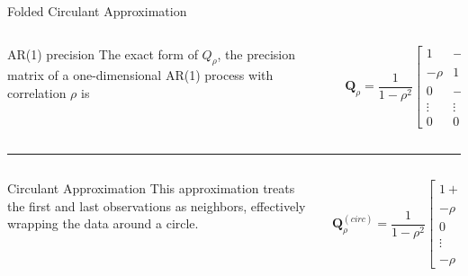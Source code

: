 \documentclass[
  ignorenonframetext,
]{beamer}
\begin{document}
\begin{frame}{Folded Circulant Approximation}
\label{folded-circulant-approximation}
\begin{columns}[T]
\begin{column}{0.4\textwidth}
\begin{block}{AR(1) precision}
\label{ar1-precision}
The exact form of \(Q_{\rho}\), the precision matrix of a
one-dimensional AR(1) process with correlation \(\rho\) is
\end{block}
\end{column}

\begin{column}{0.6\textwidth}
\[
\mathbf{Q}_\rho = \frac{1}{1-\rho^2}
\begin{bmatrix}
1 & -\rho & 0 & \cdots & 0 \\
-\rho & 1+\rho^2 & -\rho & \cdots & 0 \\
0 & -\rho & 1+\rho^2 & \cdots & 0 \\
\vdots & \vdots & \vdots & \ddots & \vdots \\
0 & 0 & 0 & \cdots & 1
\end{bmatrix}
\]
\end{column}
\end{columns}

\begin{center}\rule{0.5\linewidth}{0.5pt}\end{center}

\begin{columns}[T]
\begin{column}{0.4\textwidth}
\begin{block}{Circulant Approximation}
\label{circulant-approximation}
This approximation treats the first and last observations as neighbors,
effectively wrapping the data around a circle.
\end{block}
\end{column}

\begin{column}{0.6\textwidth}
\[
\mathbf{Q}_\rho^{(circ)} = \frac{1}{1-\rho^2}
\begin{bmatrix}
1+\rho^2 & -\rho & 0 & \cdots & 0 & -\rho \\
-\rho & 1+\rho^2 & -\rho & \cdots & 0 & 0 \\
0 & -\rho & 1+\rho^2 & \cdots & 0 & 0 \\
\vdots & \vdots & \vdots & \ddots & \vdots & \vdots \\
-\rho & 0 & 0 & \cdots & -\rho & 1+\rho^2
\end{bmatrix}
\]
\end{column}
\end{columns}


\end{frame}
\end{document}
